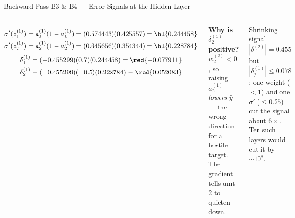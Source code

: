 \documentclass[aspectratio=169,10pt]{beamer}
\begin{document}
\begin{frame}{Backward Pass B3 \& B4 --- Error Signals at the Hidden Layer}
\begin{columns}[T]
{\small
\begin{align*}
\sigma'(z^{(1)}_1)&=a^{(1)}_1(1-a^{(1)}_1)=(0.574443)(0.425557)=\hl{0.244458}\\
\sigma'(z^{(1)}_2)&=a^{(1)}_2(1-a^{(1)}_2)=(0.645656)(0.354344)=\hl{0.228784}
\end{align*}}
{\small
\begin{align*}
\delta^{(1)}_1&=(-0.455299)(0.7)(0.244458)=\red{-0.077911}\\
\delta^{(1)}_2&=(-0.455299)(-0.5)(0.228784)=\red{0.052083}
\end{align*}}
\begin{wbox}\scriptsize\textbf{Why is $\delta^{(1)}_2$ positive?} $w^{(2)}_2<0$, so raising $a^{(1)}_2$ \emph{lowers} $\hat y$ --- the wrong direction for a hostile target. The gradient tells unit 2 to quieten down.\end{wbox}
\begin{cbox}{Shrinking signal}
$|\delta^{(2)}|=0.455$ but $|\delta^{(1)}_j|\le0.078$: one weight ($<1$) and one $\sigma'$ ($\le0.25$) cut the signal about $6\times$. Ten such layers would cut it by $\sim\!10^{8}$.
\end{cbox}
\end{columns}
\end{frame}
\end{document}
